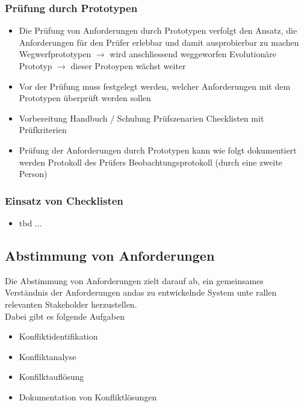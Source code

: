 \documentclass{report}
\theoremstyle{definition}
\theoremstyle{example}
\begin{document}
\subsubsection{Prüfung durch Prototypen}
\begin{itemize}
   \item Die Prüfung von Anforderungen durch Prototypen verfolgt den Ansatz, die Anforderungen für den Prüfer erlebbar und damit ausprobierbar zu machen
   \subitem Wegwerfprototypen $\rightarrow$ wird anschliessend weggeworfen
   \subitem Evolutionäre Prototyp $\rightarrow$ dieser Protoypen wächst weiter
   \item Vor der Prüfung muss festgelegt werden, welcher Anforderungen mit dem Prototypen überprüft werden sollen
   \item Vorbereitung
   \subitem Handbuch / Schulung
   \subitem Prüfszenarien
   \subitem Checklisten mit Prüfkriterien
   \item Prüfung der Anforderungen durch Prototypen kann wie folgt dokumentiert werden
   \subitem Protokoll des Prüfers
   \subitem Beobachtungsprotokoll (durch eine zweite Person)  
\end{itemize}

\subsubsection{Einsatz von Checklisten}
\begin{itemize}
   \item tbd ...
\end{itemize}


\subsection{Abstimmung von Anforderungen}
Die Abstimmung von Anforderungen zielt darauf ab, ein gemeinsames Verständnis der Anforderungen andas zu entwickelnde System unte rallen relevanten Stakeholder herzustellen.\\
Dabei gibt es folgende Aufgaben
\begin{itemize}
   \item Konfliktidentifikation
   \item Konfliktanalyse
   \item Konfilktauflösung
   \item Dokumentation von Konfliktlösungen
\end{itemize}
\end{document}
